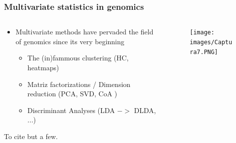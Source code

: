 \documentclass{beamer}
\begin{document}
\begin{frame}
	\frametitle{Multivariate statistics in genomics}
	\begin{columns}%
		
		\begin{column}[t]{0.65\textwidth}%
			\begin{itemize}
				\item Multivariate methods have pervaded the field of genomics since its very beginning
				\begin{itemize}
					\item The (in)fammous clustering (HC, heatmaps)
					\item Matriz factorizations / Dimension reduction (PCA, SVD, CoA )
					\item Discriminant Analyses (LDA $->$ DLDA, ...)
				\end{itemize}
			\end{itemize}
			To cite but a few.
		\end{column}
		
		\begin{column}[t]{0.25\textwidth}%
			\begin{figure}[ht]
				\centering
				\texttt{[image: images/Captura7.PNG]}
			\end{figure} 
		\end{column}
	\end{columns}
\end{frame} 
\end{document}

